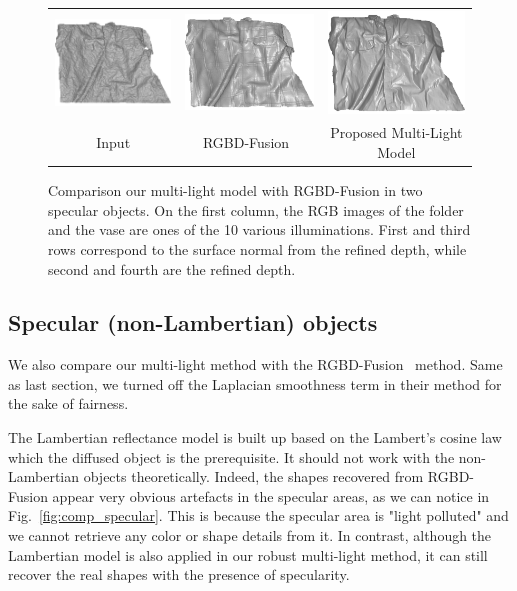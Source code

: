 \begin{figure}[!ht]
{\begin{tabular}{c|c c}
   \includegraphics[height = 0.24\linewidth]{figures/result/robust_patternShirt_shape_init.pdf} 
   &
   \includegraphics[height = 0.24\linewidth]{figures/result/rgbd_patternShirt_shape.pdf} &
   \includegraphics[height = 0.24\linewidth]{figures/result/robust_patternShirt_shape.pdf}\\

   {Input} & {RGBD-Fusion~\cite{or2015rgbd}} & {Proposed Multi-Light Model}               
 \end{tabular}}
\caption{Comparison our multi-light model with RGBD-Fusion in two specular objects. On the first column, the RGB images of the folder and the vase are ones of  the 10 various illuminations. First and third rows correspond to the surface normal from the refined depth, while second and fourth are the refined depth.}
\label{fig:comp_complicated_albedo}
\end{figure}

\subsection{Specular (non-Lambertian) objects}
We also compare our multi-light method with the RGBD-Fusion~\cite{or2015rgbd} method.
Same as last section, we turned off the Laplacian smoothness term in their method for the sake of fairness.

The Lambertian reflectance model is built up based on the Lambert's cosine law which the diffused object is the prerequisite.
It should not work with the non-Lambertian objects theoretically.
Indeed, the shapes recovered from RGBD-Fusion appear very obvious artefacts in the specular areas, as we can notice in Fig.~\ref{fig:comp_specular}.
This is because the specular area is "light polluted" and we cannot retrieve any color or shape details from it.
In contrast, although the Lambertian model is also applied in our robust multi-light method, it can still recover the real shapes with the presence of specularity.

